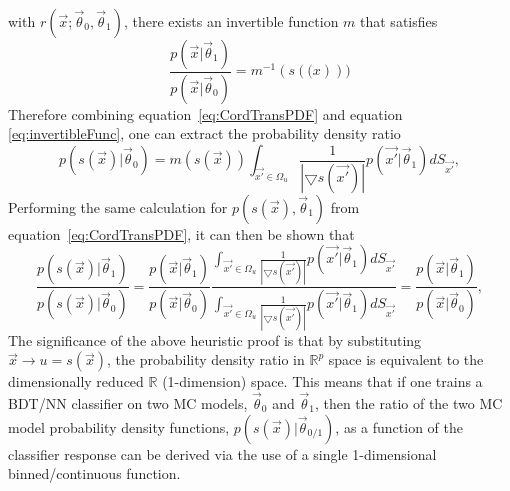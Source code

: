 with $r(\vec{x}; \vec{\theta}_{0}, \vec{\theta}_{1})$, there exists an
invertible function $m$ that satisfies
\begin{equation}
  \frac{p(\vec{x}|\vec{\theta}_{1})}{p(\vec{x}|\vec{\theta}_{0})} = m^{-1}(s(\boldsymbol(x)))
  \label{eq:invertibleFunc}
\end{equation}
Therefore combining equation~\ref{eq:CordTransPDF} and equation
\ref{eq:invertibleFunc}, one can extract the probability density ratio
\begin{equation}
  p(s(\vec{x}) | \vec{\theta}_{0}) = m(s(\vec{x})) \int_{\vec{x'} \in \Omega_{u}} \frac{1}{|\bigtriangledown s(\vec{x'})|} p(\vec{x'} | \vec{\theta}_{1}) dS_{\vec{x'}},
\end{equation}
Performing the same calculation for $p(s(\vec{x}), \vec{\theta}_{1})$
from equation~\ref{eq:CordTransPDF}, it can then be shown that
\begin{equation}
  \frac{p(s(\vec{x}) | \vec{\theta}_{1})}{p(s(\vec{x}) | \vec{\theta}_{0})} = \frac{p(\vec{x}|\vec{\theta}_{1})}{p(\vec{x}|\vec{\theta}_{0})} \frac{\int_{\vec{x'} \in \Omega_{u}} \frac{1}{|\bigtriangledown s(\vec{x'})|} p(\vec{x'} | \vec{\theta}_{1}) dS_{\vec{x'}}}{\int_{\vec{x'} \in \Omega_{u}} \frac{1}{|\bigtriangledown s(\vec{x'})|} p(\vec{x'} | \vec{\theta}_{1}) dS_{\vec{x'}}} =  \frac{p(\vec{x}|\vec{\theta}_{1})}{p(\vec{x}|\vec{\theta}_{0})},
\end{equation}
The significance of the above heuristic proof is that by substituting
$\vec{x} \rightarrow u = s(\vec{x})$, the probability density
ratio in $\mathbb{R}^{p}$ space is equivalent to the dimensionally reduced
$\mathbb{R}$ (1-dimension) space. This means that if one trains a BDT/NN
classifier on two MC models, $\vec{\theta}_{0}$ and $\vec{\theta}_{1}$, then the
ratio of the two MC model probability density functions, $p(s(\vec{x}) |
\vec{\theta}_{0/1})$, as a function of the classifier response can be derived
via the use of a single 1-dimensional binned/continuous function.

